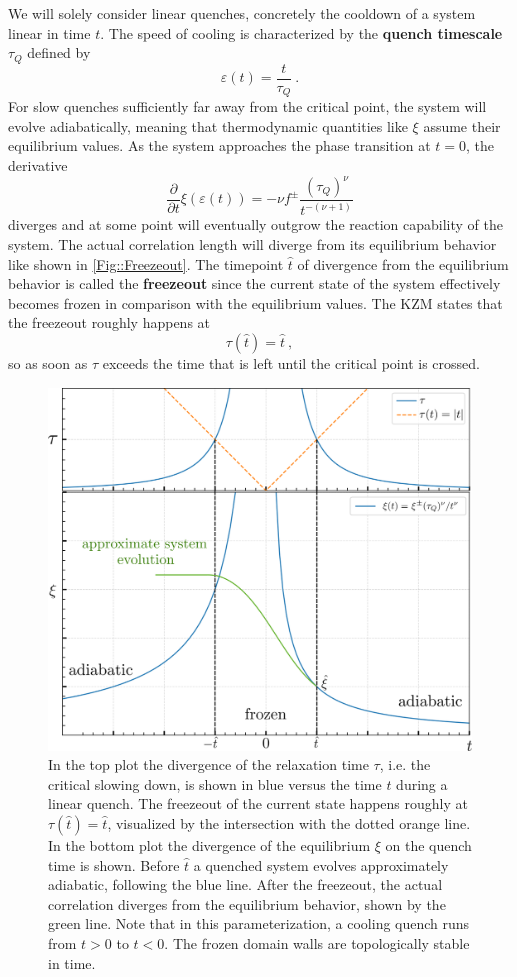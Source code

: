 	We will solely consider linear quenches, concretely the cooldown of a system linear in time $t$. The speed of cooling is characterized by the \textbf{quench timescale} $\tau_Q$ defined by
	\begin{equation} \label{Eq::Linear-Quench}
		\varepsilon(t) =	\frac{t}{\tau_Q}~.
	\end{equation}
	For slow quenches sufficiently far away from the critical point, the system will evolve adiabatically, meaning that thermodynamic quantities like $\xi$ assume their equilibrium values. As the system approaches the phase transition at $t=0$, the derivative
	\begin{equation}
		\frac{\partial}{\partial t} \xi(\varepsilon(t)) =	- \nu f^{\pm} \frac{(\tau_Q)^\nu}{t^{-(\nu + 1)}}
	\end{equation}
	diverges and at some point will eventually outgrow the reaction capability of the system. The actual correlation length will diverge from its equilibrium behavior like shown in \autoref{Fig::Freezeout}. The timepoint $\hat{t}$ of divergence from the equilibrium behavior is called the \textbf{freezeout} since the current state of the system effectively becomes frozen in comparison with the equilibrium values. The KZM states that the freezeout roughly happens at
	\begin{equation}
		\tau(\hat{t}) = \hat{t}~,
	\end{equation}
	so as soon as $\tau$ exceeds the time that is left until the critical point is crossed.
	\begin{figure}[t!]
		\centering
		\includegraphics[width=0.7\linewidth]{graphics/KZM-divergences.png}
		\caption{In the top plot the divergence of the relaxation time $\tau$, i.e. the critical slowing down, is shown in blue versus the time $t$ during a linear quench. The freezeout of the current state happens roughly at $\tau(\hat{t}) =	\hat{t}$, visualized by the intersection with the dotted orange line. In the bottom plot the divergence of the equilibrium $\xi$ on the quench time is shown. Before $\hat{t}$ a quenched system evolves approximately adiabatic, following the blue line. After the freezeout, the actual correlation diverges from the equilibrium behavior, shown by the green line. Note that in this parameterization, a cooling quench runs from $t > 0$ to $t < 0$. The frozen domain walls are topologically stable in time.}
		\label{Fig::Freezeout}
	\end{figure}
